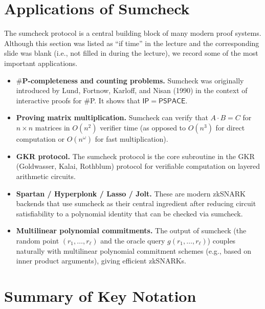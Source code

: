 \documentclass[11pt]{article}
\theoremstyle{plain}
\theoremstyle{definition}
\begin{document}
\section{Applications of Sumcheck}

The sumcheck protocol is a central building block of many modern proof systems. Although this
section was listed as ``if time'' in the lecture and the corresponding slide was blank (i.e., not
filled in during the lecture), we record some of the most important applications.

\begin{itemize}
  \item \textbf{$\#$P-completeness and counting problems.} Sumcheck was originally introduced by
        Lund, Fortnow, Karloff, and Nisan (1990) in the context of interactive proofs for $\#$P.
        It shows that $\mathsf{IP} = \mathsf{PSPACE}$.

  \item \textbf{Proving matrix multiplication.} Sumcheck can verify that $A \cdot B = C$ for
        $n \times n$ matrices in $O(n^2)$ verifier time (as opposed to $O(n^3)$ for direct
        computation or $O(n^\omega)$ for fast multiplication).

  \item \textbf{GKR protocol.} The sumcheck protocol is the core subroutine in the GKR (Goldwasser,
        Kalai, Rothblum) protocol for verifiable computation on layered arithmetic circuits.

  \item \textbf{Spartan / Hyperplonk / Lasso / Jolt.} These are modern zkSNARK backends that use
        sumcheck as their central ingredient after reducing circuit satisfiability to a polynomial
        identity that can be checked via sumcheck.

  \item \textbf{Multilinear polynomial commitments.} The output of sumcheck (the random point
        $(r_1, \ldots, r_\ell)$ and the oracle query $g(r_1, \ldots, r_\ell)$) couples naturally
        with multilinear polynomial commitment schemes (e.g., based on inner product arguments),
        giving efficient zkSNARKs.
\end{itemize}

\appendix
\section*{Summary of Key Notation}
\end{document}
